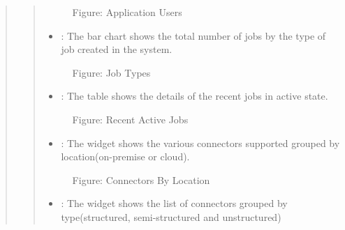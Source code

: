 \documentclass[letterpaper,10pt,english]{sphinxmanual}
\begin{document}
\begin{quote}
\begin{quote}
\begin{figure}[htbp]
\centering
\capstart

\noindent{}
\caption{Figure: Application Users}\label{\detokenize{loom_getting_started_guide:id23}}\end{figure}
\begin{itemize}
\item {} 
: The bar chart shows the total number of jobs by the type of job created in the system.

\end{itemize}

\begin{figure}[htbp]
\centering
\capstart

\noindent{}
\caption{Figure: Job Types}\label{\detokenize{loom_getting_started_guide:id24}}\end{figure}
\begin{itemize}
\item {} 
: The table shows the details of the recent jobs in active state.

\end{itemize}

\begin{figure}[htbp]
\centering
\capstart

\noindent{}
\caption{Figure: Recent Active Jobs}\label{\detokenize{loom_getting_started_guide:id25}}\end{figure}
\begin{itemize}
\item {} 
: The widget shows the various connectors supported grouped by location(on-premise or cloud).

\end{itemize}

\begin{figure}[htbp]
\centering
\capstart

\noindent{}
\caption{Figure: Connectors By Location}\label{\detokenize{loom_getting_started_guide:id26}}\end{figure}
\begin{itemize}
\item {} 
: The widget shows the list of connectors grouped by type(structured, semi-structured and unstructured)


\end{itemize}
\end{quote}
\end{quote}
\end{document}

